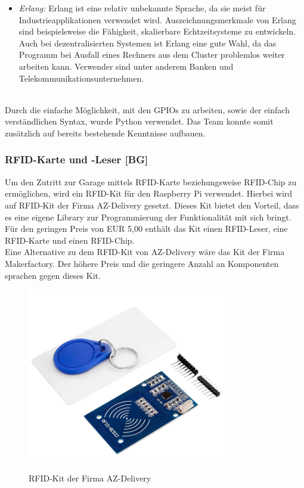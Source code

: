 \begin{itemize}
  \item \textit{Erlang: } Erlang ist eine relativ unbekannte Sprache, da sie meist für Industrieapplikationen verwendet wird. Auszeichnungsmerkmale von Erlang sind beispielsweise die Fähigkeit, skalierbare Echtzeitsysteme zu entwickeln. Auch bei dezentralisierten Systemen ist Erlang eine gute Wahl, da das Programm bei Ausfall eines Rechners aus dem Cluster problemlos weiter arbeiten kann. Verwender sind unter anderem Banken und Telekommunikationsunternehmen.
\end{itemize}
\cite{RaspberryProgramming}\\
Durch die einfache Möglichkeit, mit den GPIOs zu arbeiten, sowie der einfach verständlichen Syntax, wurde Python verwendet. Das Team konnte somit zusätzlich auf bereits bestehende Kenntnisse aufbauen.

\subsubsection{RFID-Karte und -Leser [BG]}

Um den Zutritt zur Garage mittels RFID-Karte beziehungsweise RFID-Chip zu ermöglichen, wird ein RFID-Kit für den Raspberry Pi verwendet. Hierbei wird auf RFID-Kit der Firma AZ-Delivery gesetzt. Dieses Kit bietet den Vorteil, dass es eine eigene Library zur Programmierung der Funktionalität mit sich bringt. Für den geringen Preis von EUR 5,00 enthält das Kit einen RFID-Leser, eine RFID-Karte und einen RFID-Chip.
\cite{RFIDaz}\\

Eine Alternative zu dem RFID-Kit von AZ-Delivery wäre das Kit der Firma Makerfactory. Der höhere Preis und die geringere Anzahl an Komponenten sprachen gegen dieses Kit.
\cite{RFIDalternative}

\begin{figure}[H]
  \centering
  \includegraphics[width=0.8\textwidth]{pics/RFID-Kit-AZ.png}
  \caption{RFID-Kit der Firma AZ-Delivery}
  \cite{RFIDaz}
\end{figure}

